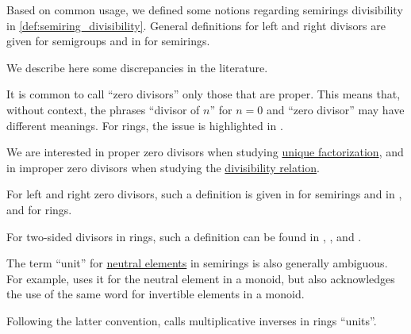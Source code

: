 \begin{remark}\label{rem:semiring_divisibility_terminology}
  Based on common usage, we defined some notions regarding semirings divisibility in \cref{def:semiring_divisibility}. General definitions for left and right divisors are given \cite[65]{Ляпин1960Полугруппы} for semigroups and in \cite[11]{Golan1999Semirings} for semirings.

  We describe here some discrepancies in the literature.

  \begin{thmenum}
     It is common to call \enquote{zero divisors} only those that are proper. This means that, without context, the phrases \enquote{divisor of \( n \)} for \( n = 0 \) and \enquote{zero divisor} may have different meanings. For rings, the issue is highlighted in \cite[98]{Bourbaki1998Algebra1to3}.

    We are interested in proper zero divisors when studying \hyperref[def:irreducible_factorization/unique]{unique factorization}, and in improper zero divisors when studying the \hyperref[def:divisibility_relation]{divisibility relation}.

    For left and right zero divisors, such a definition is given in \cite[4]{Golan1999Semirings} for semirings and in \cite[98]{Bourbaki1998Algebra1to3}, \cite[90]{Jacobson1985BasicAlgebraI} and \cite[def. 5.2]{ГеновМиховскиМоллов1991Алгебра} for rings.

    For two-sided divisors in rings, such a definition can be found in
    \cite[91]{Lang2002Algebra},
    \cite[111]{Тыртышников2017ОсновыАлгебры},
    \cite[144]{Knapp2016BasicAlgebra} and
    \cite[139]{БелоусовТкачёв2004ДискретнаяМатематика}.

     The term \enquote{unit} for \hyperref[def:semigroup_neutral_element]{neutral elements} in semirings is also generally ambiguous. For example, \textcite[def. 1.2]{Jacobson1985BasicAlgebraI} uses it for the neutral element in a monoid, but also acknowledges the use of the same word for invertible elements in a monoid.

    Following the latter convention, \textcite[143]{Knapp2016BasicAlgebra} calls multiplicative inverses in rings \enquote{units}.
  \end{thmenum}
\end{remark}

